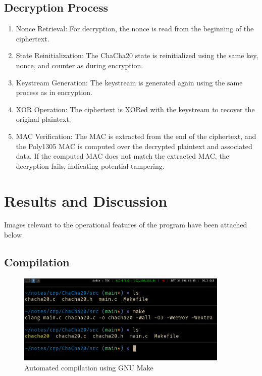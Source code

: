 \documentclass[a4paper,12pt]{report}
\begin{document}
\section{Decryption Process}
\begin{enumerate}
    \item Nonce Retrieval: For decryption, the nonce is read from the beginning of the ciphertext.
    \item State Reinitialization: The ChaCha20 state is reinitialized using the same key, nonce, and counter as during encryption.
    \item Keystream Generation: The keystream is generated again using the same process as in encryption.
    \item XOR Operation: The ciphertext is XORed with the keystream to recover the original plaintext.
    \item MAC Verification: The MAC is extracted from the end of the ciphertext, and the Poly1305 MAC is computed over the decrypted plaintext and associated data.
    If the computed MAC does not match the extracted MAC, the decryption fails, indicating potential tampering.
\end{enumerate}

\chapter{Results and Discussion}
Images relevant to the operational features of the program have been attached below

\section{Compilation}
\begin{figure}[h]
	\centering
	\includegraphics[width=0.9\textwidth]{../assets/1_make.png}
        \caption{Automated compilation using GNU Make}
	\label{image}
\end{figure}
\end{document}
